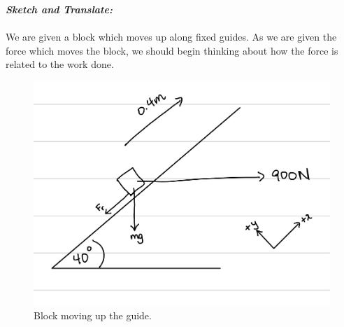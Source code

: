 \begin{subquestions}
\begin{subsubquestions}
\end{subsubquestions}	
	
	
\subquestion

\begin{subsubquestions}

\subsubquestion

\textbf{\textit{Sketch and Translate:}} \\ \\
We are given a block which moves up along fixed guides. As we are given the force which moves the block, we should begin thinking about how the force is related to the work done.
\begin{figure}[H]
	\begin{center}
		\includegraphics[scale=0.25]{../2011/figures/2011q6-1}
		\caption{\label{2011:q6:Sketch2} Block moving up the guide.}
	\end{center}
\end{figure}
	
	
	

\end{subsubquestions}
\end{subquestions}
